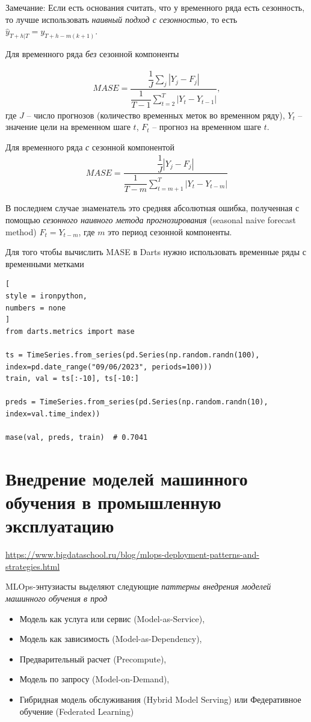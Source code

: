 \documentclass[%
	11pt,
	a4paper,
	utf8,
		]{article}
\begin{document}
Замечание: Если есть основания считать, что у временного ряда есть сезонность, то лучше использовать \emph{наивный подход с сезонностью}, то есть $ \hat{y}_{T + h | T} = y_{T +h - m (k + 1)} $.

Для временного ряда \emph{без} сезонной компоненты

\begin{align*}
	MASE = \dfrac{ \dfrac{1}{J} \sum_j |Y_j - F_j| }{ \dfrac{1}{T - 1 } \sum_{t=2}^T |Y_t - Y_{t-1} | },
\end{align*}
где $ J $ -- число прогнозов (количество временных меток во временном ряду), $ Y_t $ -- значение цели на временном шаге $ t $, $ F_t $ -- прогноз на временном шаге $ t $.

Для временного ряда \emph{с} сезонной компонентой
\begin{align*}
	MASE = \dfrac{ \dfrac{1}{J} | Y_j - F_j | }{ \dfrac{1}{T - m} \sum_{t = m + 1}^T | Y_t - Y_{t - m} | }
\end{align*}

В последнем случае знаменатель это средняя абсолютная ошибка, полученная с помощью \emph{сезонного наивного метода прогнозирования} (seasonal naive forecast method) $ F_t = Y_{t - m} $, где $ m $ это период сезонной компоненты. 

Для того чтобы вычислить MASE в Darts нужно использовать временные ряды с временными метками
\begin{lstlisting}[
style = ironpython,
numbers = none
]
from darts.metrics import mase

ts = TimeSeries.from_series(pd.Series(np.random.randn(100), index=pd.date_range("09/06/2023", periods=100)))
train, val = ts[:-10], ts[-10:]

preds = TimeSeries.from_series(pd.Series(np.random.randn(10), index=val.time_index))

mase(val, preds, train)  # 0.7041
\end{lstlisting}



\section{Внедрение моделей машинного обучения в промышленную эксплуатацию}

\url{https://www.bigdataschool.ru/blog/mlops-deployment-patterns-and-strategies.html}

MLOps-энтузиасты выделяют следующие \emph{паттерны внедрения моделей машинного обучения в прод}
\begin{itemize}
	\item Модель как услуга или сервис (Model-as-Service),
	
	\item Модель как зависимость (Model-as-Dependency),
	
	\item Предварительный расчет (Precompute),
	
	\item Модель по запросу (Model-on-Demand),
	
	\item Гибридная модель обслуживания (Hybrid Model Serving) или Федеративное обучение (Federated Learning)
\end{itemize}
\end{document}
